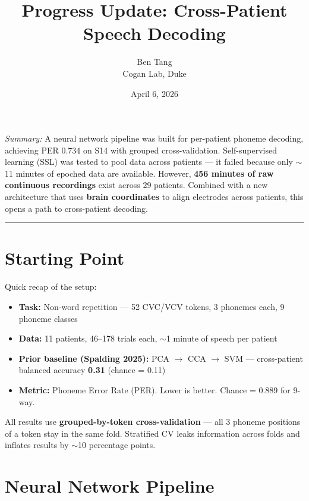 \documentclass[11pt]{article}
\title{\textbf{Progress Update: Cross-Patient Speech Decoding}}
\author{Ben Tang \\ Cogan Lab, Duke}
\date{April 6, 2026}
\begin{document}
\maketitle
\thispagestyle{empty}

\noindent\textit{Summary:} A neural network pipeline was built for per-patient phoneme decoding, achieving PER 0.734 on S14 with grouped cross-validation. Self-supervised learning (SSL) was tested to pool data across patients --- it failed because only $\sim$11 minutes of epoched data are available. However, \textbf{456 minutes of raw continuous recordings} exist across 29 patients. Combined with a new architecture that uses \textbf{brain coordinates} to align electrodes across patients, this opens a path to cross-patient decoding.

\bigskip
\hrule
\bigskip

\section{Starting Point}

Quick recap of the setup:

\begin{itemize}[nosep]
    \item \textbf{Task:} Non-word repetition --- 52 CVC/VCV tokens, 3 phonemes each, 9 phoneme classes
    \item \textbf{Data:} 11 patients, 46--178 trials each, $\sim$1 minute of speech per patient
    \item \textbf{Prior baseline (Spalding 2025):} PCA $\to$ CCA $\to$ SVM --- cross-patient balanced accuracy \textbf{0.31} (chance = 0.11)
    \item \textbf{Metric:} Phoneme Error Rate (PER). Lower is better. Chance = 0.889 for 9-way.
\end{itemize}

All results use \textbf{grouped-by-token cross-validation} --- all 3 phoneme positions of a token stay in the same fold. Stratified CV leaks information across folds and inflates results by $\sim$10 percentage points.

\section{Neural Network Pipeline}
\end{document}

